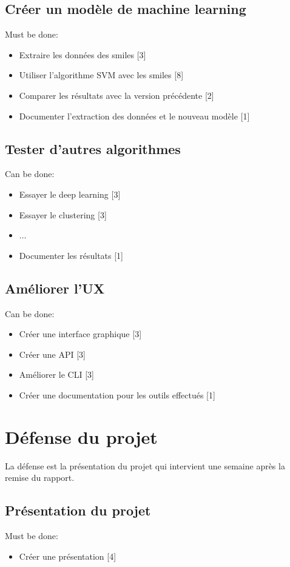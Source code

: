          \subsection*{Créer un modèle de machine learning}
            Must be done:
            \begin{itemize}
               \item Extraire les données des \acrshort{smiles} [3]
               \item Utiliser l'algorithme SVM avec les \acrshort{smiles} [8]
               \item Comparer les résultats avec la version précédente [2]
               \item Documenter l'extraction des données et le nouveau modèle [1]
            \end{itemize}
            \subsection*{Tester d'autres algorithmes}
            Can be done:
            \begin{itemize}
               \item Essayer le deep learning [3]
               \item Essayer le clustering [3]
               \item ...
               \item Documenter les résultats [1]
            \end{itemize}
            \subsection*{Améliorer l'UX}
            Can be done:
            \begin{itemize}
               \item Créer une interface graphique [3]
               \item Créer une API [3]
               \item Améliorer le CLI [3]
               \item Créer une documentation pour les outils effectués [1]
            \end{itemize}

   \section{Défense du projet}
   \label{sec:defense}

         La défense est la présentation du projet qui intervient une semaine après la remise du rapport.

         \subsection*{Présentation du projet}
            Must be done:
            \begin{itemize}
               \item Créer une présentation [4]
            \end{itemize}